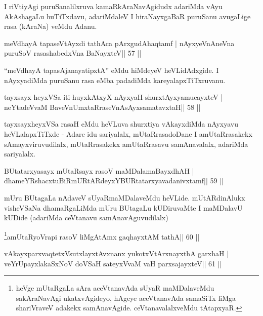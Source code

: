 \begin{artha}
I riVtiyAgi puruSanalilxruva kamaRkAraNavAgidudx adariMda vAyu AkAshagaLu huTiTxdavu, adariMdaleV I hiraNayxgaBaR puruSanu avugaLige rasa (kAraNa) veMdu Adanu.
\end{artha}

\begin{shl}
meVdhayA tapaseVtAyxdi tathAca pArxgudAhaqtamf |
nAyxyeVnAneVna puruSoV rasashabedxVna BaNayxteV\hfill || 57 ||
\end{shl}

\begin{artha}
``meVdhayA tapasA\s janayatipxtA'' eMdu hiMdeyeV heVLidAdxgide. I nAyxyadiMda puruSanu rasa eMba padadiMda kareyalapxTiTxruvanu.
\end{artha}

\begin{shl}
tayxsayx heyxVSa iti huyxkAtxyX nAyxyaH shurxtAyx\s yamucayxteV |
neYtadeVvaM BaveVnUmxtaRraseVnAsAyxsamatavxtaH\hfill || 58 ||
\end{shl}

\begin{artha}
tayxsayxheyxVSa rasaH eMdu heVLuva shurxtiya vAkayxdiMda nAyxyavu heVLalapxTiTxde - Adare idu sariyalalx, mUtaRrasadoDane I amUtaRrasakekx sAmayxviruvudilalx, mUtaRrasakekx amUtaRrasavu samAnavalalx, adariMda sariyalalx.
\end{artha}



\begin{shl}
BUtatarxyasayx mUtaRsayx rasoV maMDalamaBayxdhAH |
dhameYRshacxtuBiRmURtARdeyxYBURtatarxyavadanivxtamf\hfill || 59 ||
\end{shl}

\begin{artha}
mUru BUtagaLa nAdaveV sUyaRmaMDalaveMdu heVLide. mUtARdinAlukx
visheVSaNa dhamaRgaLiMda mUru BUtagaLu kUDiruvaMte I maMDalavU kUDide
(adariMda ceVtanavu samAnavAguvudilalx)
\end{artha}


\begin{shl}
\footnote{heVge mUtaRgaLa sAra aceVtanavAda sUyaR maMDalaveMdu
sakAraNavAgi ukatxvAgideyo, hAgeye aceVtanavAda samaSiTx liMga
shariVraveV adakekx samAnavAgide. ceVtanavalalxveMdu tAtapxyaR.}amUtaRyoVrapi rasoV liMgAtAmx gaqhayxtAM tathA\hfill || 60 ||
\end{shl}

\begin{shl}
vAkayxparxvaqtetxVsutxlayxtAvxnanx yukotxV\s tArxnayxthA garxhaH |
veYrUpayxlakaSxNoV doVSaH sateyxVvaM vaH parxsajayxteV\hfill || 61 ||
\end{shl}

